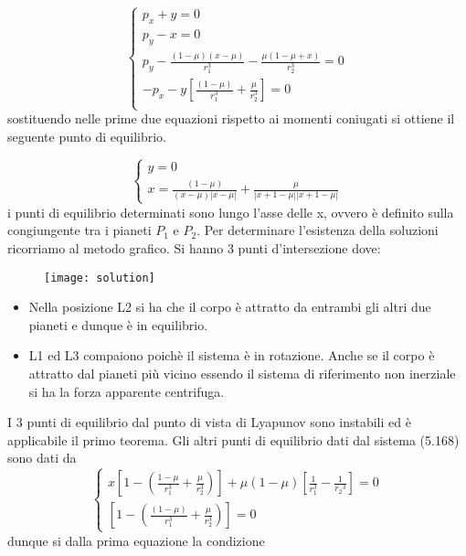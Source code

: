 \begin{equation}
\left\{\begin{array}{l}
p_x+y = 0 \\
p_y-x = 0 \\ 
p_y-\frac{(1-\mu)(x-\mu)}{r_1^3}-\frac{\mu(1-\mu+x)}{r_2^3} = 0\\
-p_x-y\left[\frac{(1-\mu)}{r_1^3}+\frac{\mu}{r_2^3}\right] = 0\\
\end{array}\right.
\end{equation}
\newline
sostituendo nelle prime due equazioni rispetto ai momenti coniugati si ottiene il seguente punto di equilibrio.

\begin{equation}
\left\{\begin{array}{l}
y=0 \\
x = \frac{(1-\mu )}{(x-\mu)|x-\mu|}+\frac{\mu}{|x+1-\mu||x+1-\mu|}
\end{array}\right.
\end{equation}
\newline
i punti di equilibrio determinati sono lungo l'asse delle x, ovvero \`{e} definito sulla congiungente tra i pianeti $P_1$ e $P_2$.
Per determinare l'esistenza della soluzioni ricorriamo al metodo grafico. Si hanno 3 punti d'intersezione dove:
 
\begin{figure}[ht]
\vspace{0.1in}
\texttt{[image: solution]}	
\centering
\vspace{0.1in}
\end{figure}

\begin{itemize}
	\item Nella posizione L2 si ha che il corpo \`{e} attratto da entrambi gli altri due pianeti e dunque \`{e} in equilibrio.
	\item L1 ed L3 compaiono poich\`{e} il sistema \`{e} in rotazione. Anche se il corpo \`{e} attratto dal pianeti pi\`{u} vicino essendo il sistema di riferimento non inerziale si ha la forza apparente centrifuga.
\end{itemize}
I 3 punti di equilibrio dal punto di vista di Lyapunov sono instabili ed \`{e} applicabile il primo teorema.
Gli altri punti di equilibrio dati dal sistema (5.168) sono dati da 
\begin{equation}
\left\{\begin{array}{l}
x\left[1-\left(\frac{1-\mu}{r_1^3}+\frac{\mu}{r_2^3}\right)\right]+\mu(1-\mu)\left[\frac{1}{r_1^3}-\frac{1}{r_2{ }^3}\right]=0 \\
\left[1-\left(\frac{(1-\mu)}{r_1^3}+\frac{\mu}{r_2^3}\right)\right]=0
\end{array}\right.
\end{equation}
dunque si dalla prima equazione la condizione 
 
